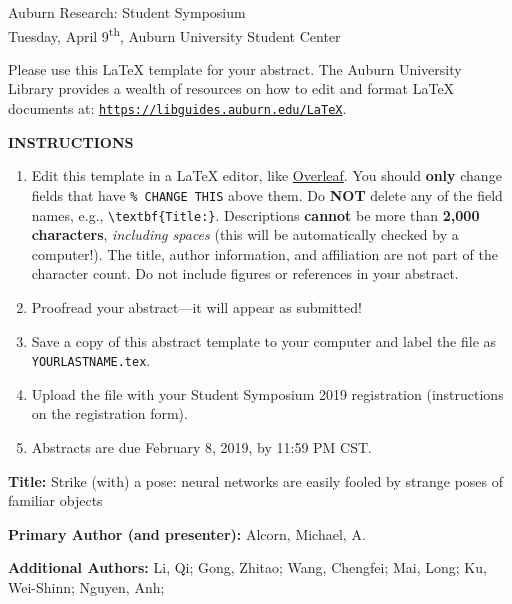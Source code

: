 \documentclass[12pt]{article}
\begin{document}
\begin{center}
    Auburn Research: Student Symposium \\ Tuesday, April 9\textsuperscript{th}, Auburn University Student Center
\end{center}

Please use this \LaTeX{} template for your abstract. The Auburn University Library provides a wealth of resources on how to edit and format \LaTeX{} documents at: \texttt{\href{https://libguides.auburn.edu/LaTeX}{https://libguides.auburn.edu/LaTeX}}.

\begin{center}
    \textbf{INSTRUCTIONS}
\end{center}

\begin{enumerate}
    \item Edit this template in a \LaTeX{} editor, like \href{https://www.overleaf.com}{Overleaf}. You should \textbf{only} change fields that have \texttt{\%~CHANGE THIS} above them. Do \textbf{NOT} delete any of the field names, e.g., \texttt{\textbackslash textbf\{Title:\}}. Descriptions \textbf{cannot} be more than \textbf{2,000 characters}, \emph{including spaces} (this will be automatically checked by a computer!). The title, author information, and affiliation are not part of the character count. Do not include figures or references in your abstract.
    \item Proofread your abstract---it will appear as submitted! 
    \item Save a copy of this abstract template to your computer and label the file as \texttt{YOURLASTNAME.tex}.
    \item Upload the file with your Student Symposium 2019 registration (instructions on the registration form). 
    \item Abstracts are due February 8, 2019, by 11:59 PM CST.
\end{enumerate}

\bigskip

\textbf{Title:} Strike (with) a pose: neural networks are easily fooled by strange poses of familiar objects

\textbf{Primary Author (and presenter):} Alcorn, Michael, A.

\textbf{Additional Authors:} Li, Qi; Gong, Zhitao; Wang, Chengfei; Mai, Long; Ku, Wei-Shinn; Nguyen, Anh;
\end{document}

